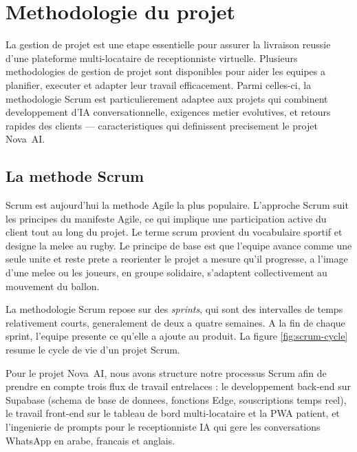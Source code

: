 \section{Methodologie du projet}
La gestion de projet est une etape essentielle pour assurer la livraison
reussie d'une plateforme multi-locataire de receptionniste virtuelle.
Plusieurs methodologies de gestion de projet sont disponibles pour aider
les equipes a planifier, executer et adapter leur travail efficacement.
Parmi celles-ci, la methodologie Scrum est particulierement adaptee aux
projets qui combinent developpement d'IA conversationnelle, exigences
metier evolutives, et retours rapides des clients --- caracteristiques
qui definissent precisement le projet Nova~AI.

\subsection{La methode Scrum}
Scrum est aujourd'hui la methode Agile la plus populaire. L'approche Scrum
suit les principes du manifeste Agile, ce qui implique une participation
active du client tout au long du projet. Le terme \og scrum \fg{} provient
du vocabulaire sportif et designe la melee au rugby. Le principe de base
est que l'equipe avance comme une seule unite et reste prete a reorienter
le projet a mesure qu'il progresse, a l'image d'une melee ou les joueurs,
en groupe solidaire, s'adaptent collectivement au mouvement du ballon.

La methodologie Scrum repose sur des \emph{sprints}, qui sont des
intervalles de temps relativement courts, generalement de deux a quatre
semaines. A la fin de chaque sprint, l'equipe presente ce qu'elle a
ajoute au produit. La figure \ref{fig:scrum-cycle} resume le cycle de vie
d'un projet Scrum.



Pour le projet Nova~AI, nous avons structure notre processus Scrum afin
de prendre en compte trois flux de travail entrelaces : le developpement
back-end sur Supabase (schema de base de donnees, fonctions Edge,
souscriptions temps reel), le travail front-end sur le tableau de bord
multi-locataire et la PWA patient, et l'ingenierie de prompts pour le
receptionniste IA qui gere les conversations WhatsApp en arabe, francais
et anglais.

